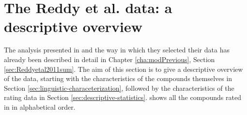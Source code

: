\section{The Reddy et al. data: a descriptive overview}
\label{sec:reddy_et_al}

The analysis presented in \citet{Reddyetal:2011} and the way in which they selected their
data has already been described in detail in Chapter \ref{cha:modPrevious}, Section
\ref{sec:Reddyetal2011sum}. The aim of this section is to give a
descriptive overview of the data, starting with the characteristics of
the compounds themselves in Section
\ref{sec:linguistic-characeterization}, followed by the
characteristics of the rating data in Section
\ref{sec:descriptive-statistics}.  shows
all the compounds rated in \citet{Reddyetal:2011} in alphabetical
order.

